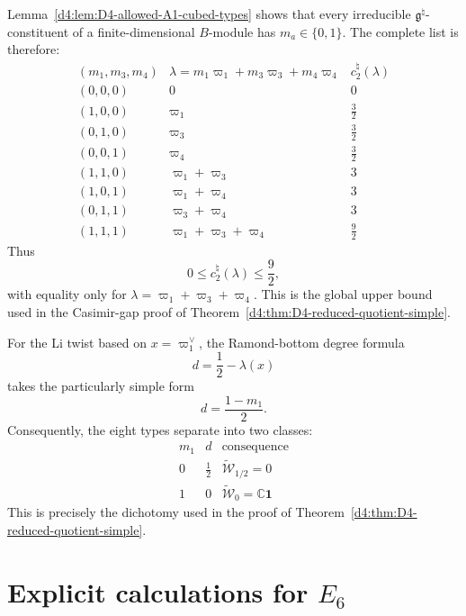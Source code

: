 \documentclass[11pt,reqno]{amsart}
\theoremstyle{definition}
\theoremstyle{remark}
\begin{document}
Lemma~\ref{d4:lem:D4-allowed-A1-cubed-types} shows that every irreducible
\(\mathfrak g^\natural\)-constituent of a finite-dimensional
\(B\)-module has \(m_a\in\{0,1\}\).  The complete list is therefore:
\begin{equation*}
\begin{array}{c|c|c}
 (m_1,m_3,m_4)
 &
 \lambda=m_1\varpi_1+m_3\varpi_3+m_4\varpi_4
 &
 c_2^\natural(\lambda)
 \\ \hline
 (0,0,0)&0&0\\
 (1,0,0)&\varpi_1&\frac32\\
 (0,1,0)&\varpi_3&\frac32\\
 (0,0,1)&\varpi_4&\frac32\\
 (1,1,0)&\varpi_1+\varpi_3&3\\
 (1,0,1)&\varpi_1+\varpi_4&3\\
 (0,1,1)&\varpi_3+\varpi_4&3\\
 (1,1,1)&\varpi_1+\varpi_3+\varpi_4&\frac92
\end{array}
\end{equation*}
Thus
\begin{equation*}
  0\le c_2^\natural(\lambda)\le\frac92,
\end{equation*}
with equality only for
\(\lambda=\varpi_1+\varpi_3+\varpi_4\).
This is the global upper bound used in the Casimir-gap proof of
Theorem~\ref{d4:thm:D4-reduced-quotient-simple}.

For the Li twist based on \(x=\varpi_1^\vee\), the Ramond-bottom
degree formula
\[
  d=\frac12-\lambda(x)
\]
takes the particularly simple form
\begin{equation*}
  d=\frac{1-m_1}{2}.
\end{equation*}
Consequently, the eight types separate into two classes:
\begin{equation*}
\begin{array}{c|c|c}
 m_1&d&\text{consequence}\\ \hline
 0&\frac12&
 \widetilde{\mathcal W}_{1/2}=0\\[1mm]
 1&0&
 \widetilde{\mathcal W}_0=\mathbb C\mathbf1
\end{array}
\end{equation*}
This is precisely the dichotomy used in the proof of
Theorem~\ref{d4:thm:D4-reduced-quotient-simple}.
\section{Explicit calculations for \texorpdfstring{$E_6$}{E6}}
\end{document}
